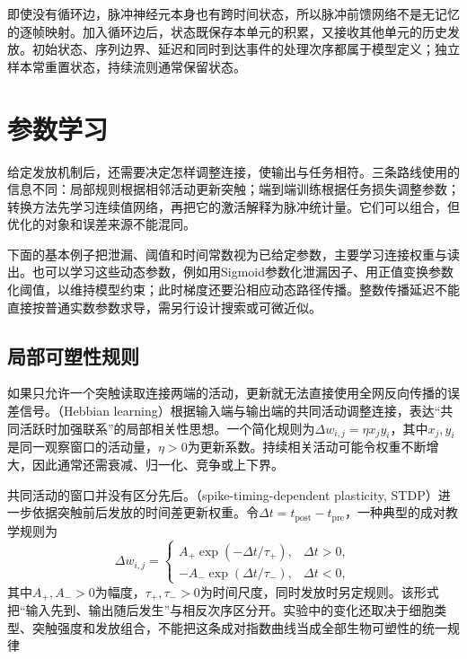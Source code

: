 即使没有循环边，脉冲神经元本身也有跨时间状态，所以脉冲前馈网络不是无记忆的逐帧映射。加入循环边后，状态既保存本单元的积累，又接收其他单元的历史发放。初始状态、序列边界、延迟和同时到达事件的处理次序都属于模型定义；独立样本常重置状态，持续流则通常保留状态。

\section{参数学习}
\label{sec:snn-learning}

给定发放机制后，还需要决定怎样调整连接，使输出与任务相符。三条路线使用的信息不同：局部规则根据相邻活动更新突触；端到端训练根据任务损失调整参数；转换方法先学习连续值网络，再把它的激活解释为脉冲统计量。它们可以组合，但优化的对象和误差来源不能混同。

下面的基本例子把泄漏、阈值和时间常数视为已给定参数，主要学习连接权重与读出。也可以学习这些动态参数，例如用Sigmoid参数化泄漏因子、用正值变换参数化阈值，以维持模型约束；此时梯度还要沿相应动态路径传播。整数传播延迟不能直接按普通实数参数求导，需另行设计搜索或可微近似。

\subsection{局部可塑性规则}
\label{sec:snn-plasticity}

如果只允许一个突触读取连接两端的活动，更新就无法直接使用全网反向传播的误差信号。（Hebbian learning）根据输入端与输出端的共同活动调整连接，表达“共同活跃时加强联系”的局部相关性思想。一个简化规则为$\Delta w_{i,j}=\eta x_jy_i$，其中$x_j,y_i$是同一观察窗口的活动量，$\eta>0$为更新系数。持续相关活动可能令权重不断增大，因此通常还需衰减、归一化、竞争或上下界。

共同活动的窗口并没有区分先后。（spike-timing-dependent plasticity, STDP）进一步依据突触前后发放的时间差更新权重。令$\Delta t=t_{\mathrm{post}}-t_{\mathrm{pre}}$，一种典型的成对教学规则为
\begin{equation}
  \Delta w_{i,j}=\begin{cases}
    A_+\exp(-\Delta t/\tau_+),&\Delta t>0,\\
    -A_-\exp(\Delta t/\tau_-),&\Delta t<0,
  \end{cases}
  \label{eq:snn-stdp}
\end{equation}
其中$A_+,A_->0$为幅度，$\tau_+,\tau_->0$为时间尺度，同时发放时另定规则。该形式把“输入先到、输出随后发生”与相反次序区分开。实验中的变化还取决于细胞类型、突触强度和发放组合，不能把这条成对指数曲线当成全部生物可塑性的统一规律

